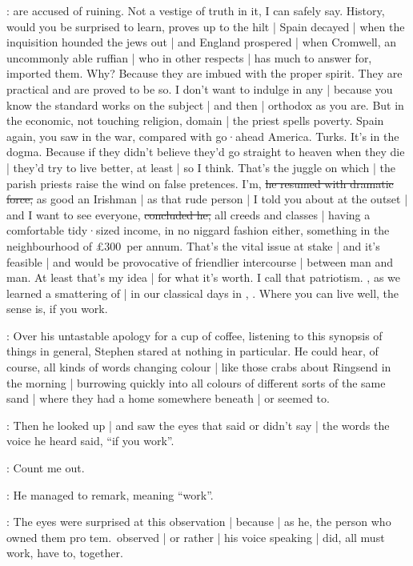 \Bloom:
are accused of ruining.%
Not a vestige of truth in it,
I can safely say.
History,
would you be surprised to learn,
proves up to the hilt |
Spain decayed |
when the inquisition hounded the jews out |
and England prospered |
when Cromwell,
an uncommonly able ruffian |
who in other respects |
has much to answer for,
imported them.
Why?
Because they are imbued with the proper spirit.
They are practical and are proved to be so.
I don't want to indulge in any |
because you know the standard works on the subject |
and then |
orthodox as you are.
But in the economic,
not touching religion,
domain |
the priest spells poverty.
Spain again,
you saw in the war,
compared with go·ahead America.
Turks.
It's in the dogma.
Because if they didn't believe they'd go straight to heaven when they die |
they'd try to live better,
at least |
so I think.
That's the juggle on which |
the parish priests raise the wind on false pretences.
I'm,
\sout{he resumed with dramatic force,}
as good an Irishman |
as that rude person |
I told you about at the outset |
and I want to see everyone,
\sout{concluded he,}
all creeds and classes  |
having a comfortable tidy·sized income,
in no niggard fashion either,
something in the neighbourhood of £300~per annum.
That's the vital issue at stake |
and it's feasible |
and would be provocative of friendlier intercourse |
between man and man.
At least that's my idea |
for what it's worth.
I call that patriotism.
,
as we learned a smattering of |
in our classical days in ,
.
Where you can live well,
the sense is,%
if you work.

:
Over his untastable apology for a cup of coffee,
listening to this synopsis of things in general,
Stephen stared at nothing in particular.
He could hear,
of course,
all kinds of words changing colour |
like those crabs about Ringsend in the morning |
burrowing quickly into all colours of different sorts of the same sand |
where they had a home somewhere beneath |
or seemed to.

:
Then he looked up |
and saw the eyes that said or didn't say |
the words the voice he heard said,
“if you work”.

\Stephen:
Count me out.

:
He managed to remark,
meaning “work”.

:
The eyes were surprised at this observation |
because |
as he,
the person who owned them pro tem.\ observed |
or rather |
his voice speaking |
did,
all must work,
have to,
together.

